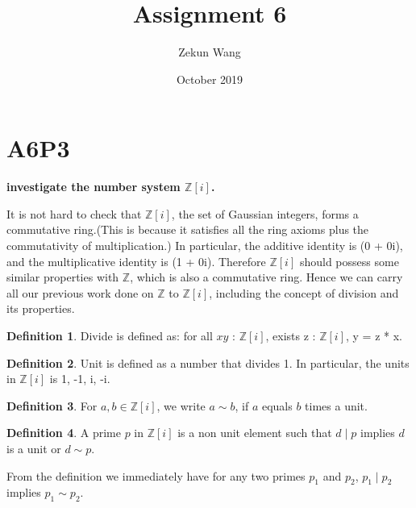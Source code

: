 \documentclass{article}
\title{Assignment 6}
\author{Zekun Wang}
\date{October 2019}
\begin{document}
\newtheorem{theorem}{Theorem}[section]

\newtheorem{lemma}[theorem]{Lemma}
\newtheorem{conjecture}[theorem]{Conjecture}
\newtheorem{corollary}{Corollary}[theorem]

\theoremstyle{definition}
\newtheorem{definition}{Definition}[section]
\newtheorem{example}{Example}[theorem]

\maketitle

\section{A6P3}

\textbf{investigate the number system $\mathbb{Z}[i]$.}

It is not hard to check that $\mathbb{Z}[i]$, the set of Gaussian integers, forms a commutative ring.(This is because it satisfies all the ring axioms plus the commutativity of multiplication.) In particular, the additive identity is (0 + 0i), and the multiplicative identity is (1 + 0i). Therefore $\mathbb{Z}[i]$ should possess some similar properties with $\mathbb{Z}$, which is also a commutative ring. Hence we can carry all our previous work done on $\mathbb{Z}$ to $\mathbb{Z}[i]$, including the concept of division and its properties. 

\begin{definition}
Divide is defined as: for all $x y$ : $\mathbb{Z}[i]$, exists z : $\mathbb{Z}[i]$, y = z * x.
\end{definition}

\begin{definition}
Unit is defined as a number that divides 1. In particular, the units in $\mathbb{Z}[i]$ is 1, -1, i, -i.
\end{definition}

\begin{definition}
For $a,b \in \mathbb{Z}[i]$, we write $a \sim b$, if $a$ equals $b$ times a unit.
\end{definition}

\begin{definition}
A prime $p$ in $\mathbb{Z}[i]$ is a non unit element such that $d\mid p$ implies $d$ is a unit or $d \sim p$.
\end{definition}
From the definition we immediately have for any two primes $p_1$ and $p_2$, $p_1 \mid p_2$ implies $p_1 \sim p_2$.
\end{document}
